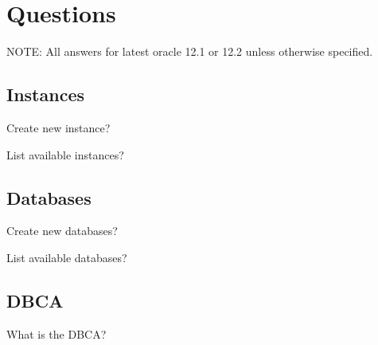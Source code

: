 
\newpage
\section{Questions}

NOTE: All answers for latest oracle 12.1 or 12.2 unless
otherwise specified.

\subsection{Instances}
\begin{itemize*}
     \item{} Create new instance?
     \item{} List available instances?
\end{itemize*}

\subsection{Databases}
\begin{itemize*}
     \item{} Create new databases?
     \item{} List available databases?
\end{itemize*}

\subsection{DBCA}
\begin{itemize*}
     \item{} What is the DBCA?
\end{itemize*}


